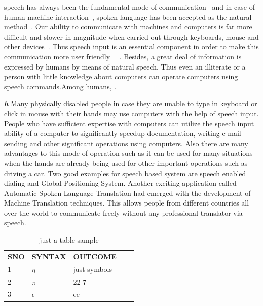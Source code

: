 \documentclass[a4paper,12pt]{report} %
\begin{document}
speech has always been the fundamental mode of communication~\cite{Devi2017} and in case of human-machine interaction~\cite{Suresh2017}, spoken language has been accepted as the natural method~\cite{Manikandan2012}. Our ability to communicate with machines and computers is far more difficult and slower in magnitude when carried out through keyboards, mouse and other devices~\cite{Rajkumar2017}. Thus speech input is an essential component in order to make this communication more user friendly~\cite{K2017} ~\cite{Maheswari2017}. Besides, a great deal of information is expressed by humans by means of natural speech. Thus even an illiterate or a person with little knowledge about computers can operate computers using speech commands.Among humans\cite{adler2011}, .\par
\textbf{\textit{h}}
Many physically disabled people in case they are unable to type in keyboard or click in mouse with their hands may use computers with the help of speech input. People who have sufficient expertise with computers can utilize the speech input ability of a computer to significantly speedup documentation, writing e-mail sending and other significant operations using computers. Also there are many advantages to this mode of operation such as it can be used for many situations when the hands are already being used for other important operations such as driving a car. Two good examples for speech based system are speech enabled dialing and Global Positioning System. Another exciting application called Automatic Spoken Language Translation had emerged with the development of Machine Translation techniques. This allows people from different countries all over the world to communicate freely without any professional translator via speech. \par
\begin{table}[]
\centering
\begin{tabular}{|l|l|l|ll}
\cline{1-3}
\textbf{SNO} & \textbf{SYNTAX}         & \textbf{OUTCOME} &  &  \\ \cline{1-3}
1            & $\eta$     & just symbols     &  &  \\ \cline{1-3}
2            & $\pi$      & 22 7             &  &  \\ \cline{1-3}
3            &$ \epsilon$ & ee               &  &  \\ \cline{1-3}
\end{tabular}
\caption{just a table sample}
\end{table}
\end{document}
